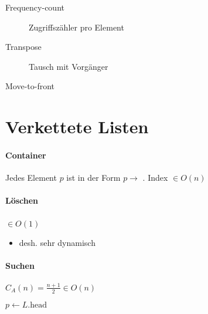 \begin{description}
  \item [Frequency-count] Zugriffszähler pro Element

  \item [Transpose] Tausch mit Vorgänger

  \item [Move-to-front]
\end{description}

\section{Verkettete Listen}

\paragraph{Container} Jedes Element $p$ ist in der Form $p \rightarrow$ . Index $\in O(n)$

\paragraph{Löschen} $\in O(1)$\

\begin{algorithm}[H]


\end{algorithm}

\begin{itemize}
  \item desh. sehr dynamisch
\end{itemize}

\paragraph{Suchen} $C_A(n) = \frac{n + 1}{2} \in O(n)$

\begin{algorithm}[H]


  $p \leftarrow L.\text{head}$

\end{algorithm}

